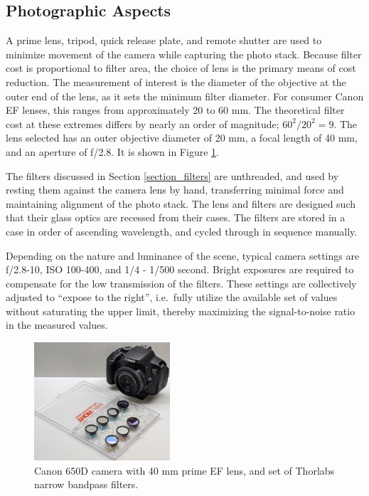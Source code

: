 \documentclass[twocolumn,10pt]{asme2ej}
\newcommand{\id}{\hspace{6 mm}}
\begin{document}
\subsection{Photographic Aspects}
\label{photographic}

A prime lens, tripod, quick release plate, and remote shutter are used to minimize movement of the camera while capturing the photo stack. Because filter cost is proportional to filter area, the choice of lens is the primary means of cost reduction. The measurement of interest is the diameter of the objective at the outer end of the lens, as it sets the minimum filter diameter. For consumer Canon EF lenses, this ranges from approximately 20 to 60 mm. The theoretical filter cost at these extremes differs by nearly an order of magnitude; $60^2 / 20^2 = 9$. The lens selected has an outer objective diameter of 20 mm, a focal length of 40 mm, and an aperture of f/2.8. It is shown in Figure \ref{canon}.

\id The filters discussed in Section \ref{section_filters} are unthreaded, and used by resting them against the camera lens by hand, transferring minimal force and maintaining alignment of the photo stack. The lens and filters are designed such that their glass optics are recessed from their cases. The filters are stored in a case in order of ascending wavelength, and cycled through in sequence manually.

\id Depending on the nature and luminance of the scene, typical camera settings are f/2.8-10, ISO 100-400, and 1/4 - 1/500 second. Bright exposures are required to compensate for the low transmission of the filters. These settings are collectively adjusted to ``expose to the right'', i.e.\ fully utilize the available set of values without saturating the upper limit, thereby maximizing the signal-to-noise ratio in the measured values.

\begin{figure}
\centering
\includegraphics[width=0.45\textwidth]{IMG_20210712_212507_GIMP.jpg}
\caption{Canon 650D camera with 40 mm prime EF lens, and set of Thorlabs narrow bandpass filters.}
\label{canon}
\end{figure}
\end{document}
